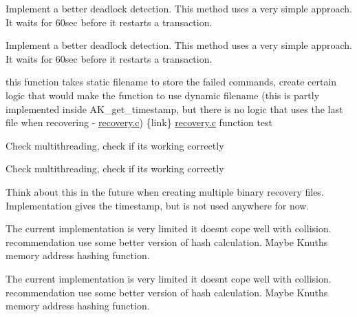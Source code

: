 
\begin{DoxyRefList}
\item[\label{todo__todo000004}%
\hypertarget{todo__todo000004}{}%
Member \hyperlink{transaction_8h_a32d2de9c87a4523887516bba8308ab34}{A\+K\+\_\+acquire\+\_\+lock} (int, int, pthread\+\_\+t)]Implement a better deadlock detection. This method uses a very simple approach. It waits for 60sec before it restarts a transaction.  
\item[\label{todo__todo000004}%
\hypertarget{todo__todo000004}{}%
Member \hyperlink{transaction_8h_a32d2de9c87a4523887516bba8308ab34}{A\+K\+\_\+acquire\+\_\+lock} (int, int, pthread\+\_\+t)]Implement a better deadlock detection. This method uses a very simple approach. It waits for 60sec before it restarts a transaction.  
\item[\label{todo__todo000001}%
\hypertarget{todo__todo000001}{}%
Member \hyperlink{archive__log_8h_a196d56d3daa734a4817e78e5e62c6dd0}{A\+K\+\_\+archive\+\_\+log} ()]this function takes static filename to store the failed commands, create certain logic that would make the function to use dynamic filename (this is partly implemented inside A\+K\+\_\+get\+\_\+timestamp, but there is no logic that uses the last file when recovering -\/ \hyperlink{recovery_8c}{recovery.\+c}) \{link\} \hyperlink{recovery_8c}{recovery.\+c} function test  
\item[\label{todo__todo000005}%
\hypertarget{todo__todo000005}{}%
Member \hyperlink{transaction_8h_ae63e0defc409bd7cd8b12f0fe44739c8}{A\+K\+\_\+execute\+\_\+commands} (command $\ast$, int)]Check multithreading, check if it\textquotesingle{}s working correctly  
\item[\label{todo__todo000005}%
\hypertarget{todo__todo000005}{}%
Member \hyperlink{transaction_8h_ae63e0defc409bd7cd8b12f0fe44739c8}{A\+K\+\_\+execute\+\_\+commands} (command $\ast$, int)]Check multithreading, check if it\textquotesingle{}s working correctly  
\item[\label{todo__todo000002}%
\hypertarget{todo__todo000002}{}%
Member \hyperlink{archive__log_8h_aeb31379a188616575d445bcb0fd6a982}{A\+K\+\_\+get\+\_\+timestamp} ()]Think about this in the future when creating multiple binary recovery files. Implementation gives the timestamp, but is not used anywhere for now.  
\item[\label{todo__todo000003}%
\hypertarget{todo__todo000003}{}%
Member \hyperlink{transaction_8h_a13fcff2b52d3512807dedb55ce61e735}{A\+K\+\_\+memory\+\_\+block\+\_\+hash} (int)]The current implementation is very limited it doesn\textquotesingle{}t cope well with collision. recommendation use some better version of hash calculation. Maybe Knuth\textquotesingle{}s memory address hashing function.  
\item[\label{todo__todo000003}%
\hypertarget{todo__todo000003}{}%
Member \hyperlink{transaction_8h_a13fcff2b52d3512807dedb55ce61e735}{A\+K\+\_\+memory\+\_\+block\+\_\+hash} (int)]The current implementation is very limited it doesn\textquotesingle{}t cope well with collision. recommendation use some better version of hash calculation. Maybe Knuth\textquotesingle{}s memory address hashing function. 
\end{DoxyRefList}